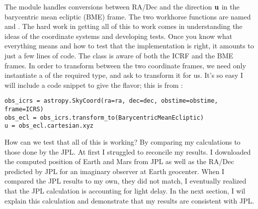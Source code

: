 The module  handles conversions between RA/Dec and the direction $\mathbf{u}$ in the barycentric mean ecliptic (BME) frame.
The two workhorse functions are named  and .
The hard work in getting all of this to work comes in understanding the ideas of the coordinate systems and developing tests.
Once you know what everything means and how to test that the implementation is right, it amounts to just a few lines of code.
The  class is aware of both the ICRF and the BME frames.
In order to transform between the two coordinate frames, we need only instantiate a  of the required type, 
and ask  to transform it for us.
It's so easy I will include a code snippet to give the flavor; this is from :
\begin{lstlisting}[style=CodeSnippet]
obs_icrs = astropy.SkyCoord(ra=ra, dec=dec, obstime=obstime, frame=ICRS)
obs_ecl = obs_icrs.transform_to(BarycentricMeanEcliptic)
u = obs_ecl.cartesian.xyz
\end{lstlisting}

How can we test that all of this is working? 
By comparing my calculations to those done by the JPL.
At first I struggled to reconcile my results.
I downloaded the computed position of Earth and Mars from JPL as well as the RA/Dec predicted by JPL for an imaginary observer at Earth geocenter.
When I compared the JPL results to my own, they did not match,
I eventually realized that the JPL calculation is accounting for light delay.
In the next section, I wil explain this calculation and demonstrate that my results are consistent with JPL.

